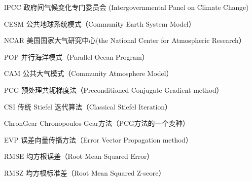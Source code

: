 \begin{denotation}[3cm]
\item[IPCC] 政府间气候变化专门委员会 (Intergovernmental Panel on Climate Change)
\item[CESM]  公共地球系统模式（Community Earth System Model）
\item[NCAR]  美国国家大气研究中心(the National Center for Atmospheric Research）
\item[POP]  并行海洋模式（Parallel Ocean Program）
\item[CAM]  公共大气模式（Community Atmosphere Model）
\item[PCG] 预处理共轭梯度法（Preconditioned Conjugate Gradient method）
\item[CSI] 传统 Stiefel 迭代算法（Classical Stiefel Iteration）
\item[ChronGear] Chronopoulos-Gear方法（PCG方法的一个变种）
\item[EVP] 误差向量传播方法（Error Vector Propagation method）
\item[RMSE] 均方根误差（Root Mean Squared Error）
\item[RMSZ] 均方根标准差（Root Mean Squared Z-score）
\end{denotation}
